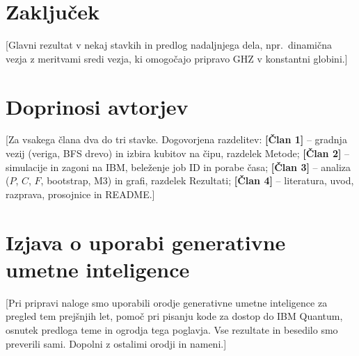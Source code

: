 \section{Zaključek}
\label{g20:sec:zakljucek}

[Glavni rezultat v nekaj stavkih in predlog nadaljnjega dela, npr.\ dinamična vezja z meritvami sredi vezja, ki omogočajo
pripravo GHZ v konstantni globini.]


\section*{Doprinosi avtorjev}

[Za vsakega člana dva do tri stavke. Dogovorjena razdelitev:
\textbf{[Član 1]} -- gradnja vezij (veriga, BFS drevo) in izbira kubitov na čipu, razdelek Metode;
\textbf{[Član 2]} -- simulacije in zagoni na IBM, beleženje job ID in porabe časa;
\textbf{[Član 3]} -- analiza ($P$, $C$, $F$, bootstrap, M3) in grafi, razdelek Rezultati;
\textbf{[Član 4]} -- literatura, uvod, razprava, prosojnice in README.]

\section*{Izjava o uporabi generativne umetne inteligence}

[Pri pripravi naloge smo uporabili orodje generativne umetne inteligence za pregled tem prejšnjih let, pomoč pri pisanju kode za dostop do
IBM Quantum, osnutek predloga teme in ogrodja tega poglavja. Vse rezultate in besedilo smo preverili sami. Dopolni z
ostalimi orodji in nameni.]

